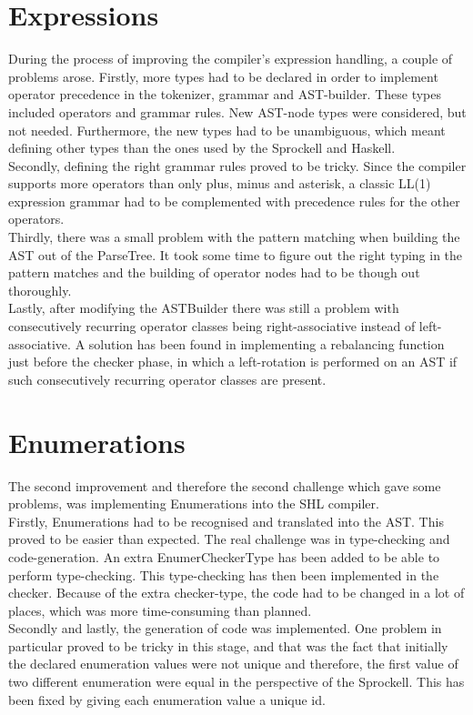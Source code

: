 \documentclass[twoside]{report}
\begin{document}
\section{Expressions}
During the process of improving the compiler's expression handling, a couple of problems arose. Firstly, more types had to be declared in order to implement operator precedence in the tokenizer, grammar and AST-builder. These types included operators and grammar rules. New AST-node types were considered, but not needed. Furthermore, the new types had to be unambiguous, which meant defining other types than the ones used by the Sprockell and Haskell. \\
Secondly, defining the right grammar rules proved to be tricky. 
Since the compiler supports more operators than only plus, minus and asterisk, a classic LL(1) expression grammar had to be complemented with precedence rules for the other operators.  \\
Thirdly, there was a small problem with the pattern matching when building the AST out of the ParseTree. It took some time to figure out the right typing in the pattern matches and the building of operator nodes had to be though out thoroughly. \\
Lastly, after modifying the ASTBuilder there was still a problem with consecutively recurring operator classes being right-associative instead of left-associative. A solution has been found in implementing a rebalancing function just before the checker phase, in which a left-rotation is performed on an AST if such consecutively recurring operator classes are present.

\section{Enumerations}
The second improvement and therefore the second challenge which gave some problems, was implementing Enumerations into the SHL compiler. \\
Firstly, Enumerations had to be recognised and translated into the AST. This proved to be easier than expected. The real challenge was in type-checking and code-generation. An extra EnumerCheckerType has been added to be able to perform type-checking. This type-checking has then been implemented in the checker. Because of the extra checker-type, the code had to be changed in a lot of places, which was more time-consuming than planned. \\
Secondly and lastly, the generation of code was implemented. One problem in particular proved to be tricky in this stage, and that was the fact that initially the declared enumeration values were not unique and therefore, the first value of two different enumeration were equal in the perspective of the Sprockell. This has been fixed by giving each enumeration value a unique id. 
\end{document}
